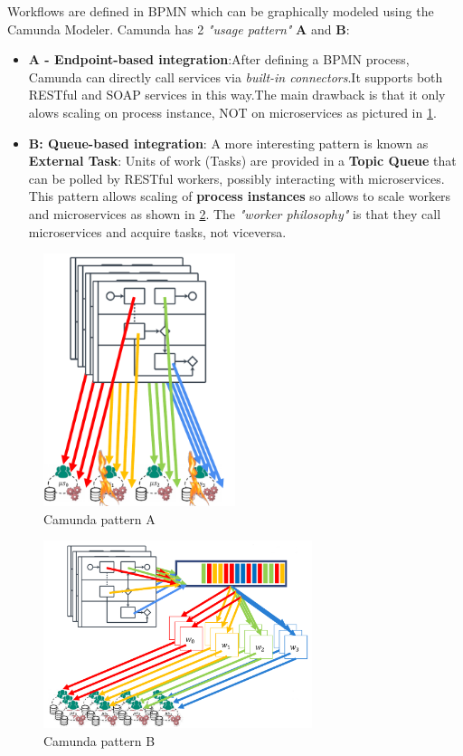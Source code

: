 \documentclass[10pt,a4paper]{report}
\begin{document}
Workflows are defined in BPMN which can be graphically modeled
using the Camunda Modeler. Camunda has 2 \textit{"usage pattern"} \textbf{A} and \textbf{B}:
\begin{itemize}
	\item \textbf{A - Endpoint-based integration}:After defining a BPMN
	process, Camunda can directly call services via \textit{built-in connectors}.It supports both RESTful and 	SOAP services in this way.The main drawback is that it only alows scaling on process instance, NOT on microservices as pictured in \ref{image-camunda-a}. 
	\item \textbf{B: Queue-based integration}: A more interesting pattern is
	known as \textbf{External Task}: Units of work (Tasks) are
	provided in a \textbf{Topic Queue} that can be polled by
	RESTful workers, possibly interacting with 	microservices. This pattern allows scaling of \textbf{process instances} so allows to scale workers and microservices as shown in \ref{image-camunda-b}.
	The \textit{"worker philosophy"} is that they call microservices and acquire tasks, not viceversa. 
\end{itemize}
\begin{figure}[h]
	\centering
	\includegraphics[width=0.5\textwidth]{camunda-pattern-A}
	\caption{Camunda pattern A}
	\label{image-camunda-a}
\end{figure}
\begin{figure}[h]
	\centering
	\includegraphics[width=0.7\textwidth]{camunda-pattern-B}
	\caption{Camunda pattern B}
	\label{image-camunda-b}
\end{figure}
\end{document}
